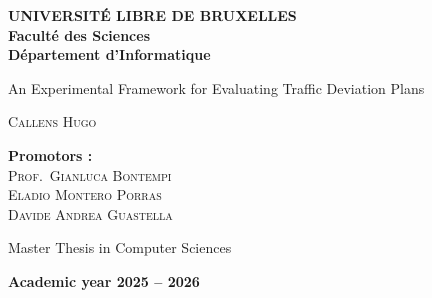 \begin{titlepage}
\thispagestyle{empty}

\begin{center}
\textbf{UNIVERSITÉ LIBRE DE BRUXELLES}\\[0.2cm]
\textbf{Faculté des Sciences}\\[0.2cm]
\textbf{Département d'Informatique}
\end{center}

\vspace{4cm}

\begin{center}
{\fontsize{16}{19.2}\selectfont An Experimental Framework for Evaluating Traffic Deviation Plans\par}
\vspace{0.5cm}
{\scshape Callens Hugo\par}
\end{center}

\vspace{4cm}

\noindent\textbf{Promotors :}\\
{\scshape Prof.\ Gianluca Bontempi}\\
{\scshape Eladio Montero Porras}\\
{\scshape Davide Andrea Guastella}

\vspace{1cm}

\begin{center}
Master Thesis in Computer Sciences
\end{center}

\vfill

\begin{center}
\textbf{Academic year 2025 -- 2026}
\end{center}
\end{titlepage}
